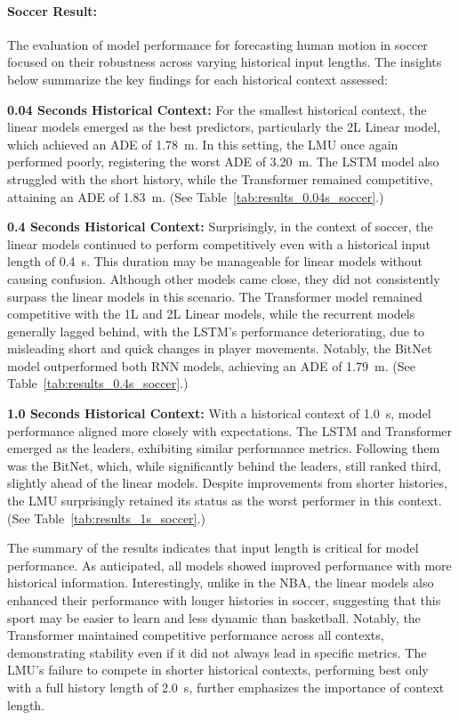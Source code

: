 \FloatBarrier
\paragraph {Soccer Result:}
The evaluation of model performance for forecasting human motion in soccer focused on their robustness across varying historical input lengths. The insights below summarize the key findings for each historical context assessed:

\textbf{0.04 Seconds Historical Context:} For the smallest historical context, the linear models emerged as the best predictors, particularly the 2L Linear model, which achieved an ADE of \SI{1.78}{\meter}. In this setting, the LMU once again performed poorly, registering the worst ADE of \SI{3.20}{\meter}. The LSTM model also struggled with the short history, while the Transformer remained competitive, attaining an ADE of \SI{1.83}{\meter}. (See Table~\ref{tab:results_0.04s_soccer}.)

\textbf{0.4 Seconds Historical Context:} Surprisingly, in the context of soccer, the linear models continued to perform competitively even with a historical input length of \SI{0.4}{\second}. This duration may be manageable for linear models without causing confusion. Although other models came close, they did not consistently surpass the linear models in this scenario. The Transformer model remained competitive with the 1L and 2L Linear models, while the recurrent models generally lagged behind, with the LSTM's performance deteriorating, due to misleading short and quick changes in player movements. Notably, the BitNet model outperformed both RNN models, achieving an ADE of \SI{1.79}{\meter}. (See Table~\ref{tab:results_0.4s_soccer}.)

\textbf{1.0 Seconds Historical Context:} With a historical context of \SI{1.0}{\second}, model performance aligned more closely with expectations. The LSTM and Transformer emerged as the leaders, exhibiting similar performance metrics. Following them was the BitNet, which, while significantly behind the leaders, still ranked third, slightly ahead of the linear models. Despite improvements from shorter histories, the LMU surprisingly retained its status as the worst performer in this context. (See Table~\ref{tab:results_1s_soccer}.)

The summary of the results indicates that input length is critical for model performance. As anticipated, all models showed improved performance with more historical information. Interestingly, unlike in the NBA, the linear models also enhanced their performance with longer histories in soccer, suggesting that this sport may be easier to learn and less dynamic than basketball. Notably, the Transformer maintained competitive performance across all contexts, demonstrating stability even if it did not always lead in specific metrics. The LMU's failure to compete in shorter historical contexts, performing best only with a full history length of \SI{2.0}{\second}, further emphasizes the importance of context length.

